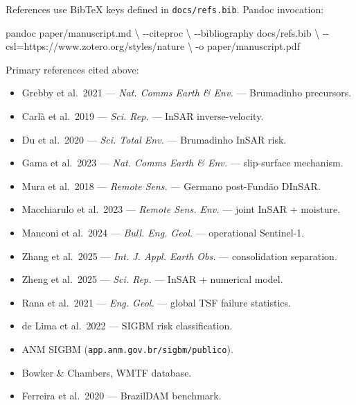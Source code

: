 \documentclass[
  11pt]{article}
\newenvironment{Shaded}{}{}
\newcommand{\AttributeTok}[1]{\textcolor[rgb]{0.49,0.56,0.16}{#1}}
\newcommand{\DataTypeTok}[1]{\textcolor[rgb]{0.56,0.13,0.00}{#1}}
\newcommand{\ExtensionTok}[1]{#1}
\newcommand{\NormalTok}[1]{#1}
\newcommand{\OperatorTok}[1]{\textcolor[rgb]{0.40,0.40,0.40}{#1}}
\providecommand{\tightlist}{%
  \setlength{\itemsep}{0pt}\setlength{\parskip}{0pt}}
\begin{document}
References use BibTeX keys defined in \texttt{docs/refs.bib}. Pandoc
invocation:

\begin{Shaded}
\begin{Highlighting}[]
\ExtensionTok{pandoc}\NormalTok{ paper/manuscript.md }\DataTypeTok{\textbackslash{}}
       \AttributeTok{{-}{-}citeproc} \DataTypeTok{\textbackslash{}}
       \AttributeTok{{-}{-}bibliography}\NormalTok{ docs/refs.bib }\DataTypeTok{\textbackslash{}}
       \AttributeTok{{-}{-}csl}\OperatorTok{=}\NormalTok{https://www.zotero.org/styles/nature }\DataTypeTok{\textbackslash{}}
       \AttributeTok{{-}o}\NormalTok{ paper/manuscript.pdf}
\end{Highlighting}
\end{Shaded}

Primary references cited above:

\begin{itemize}
\tightlist
\item
  Grebby et al.~2021 --- \emph{Nat. Comms Earth \& Env.} --- Brumadinho
  precursors.
\item
  Carlà et al.~2019 --- \emph{Sci. Rep.} --- InSAR inverse-velocity.
\item
  Du et al.~2020 --- \emph{Sci. Total Env.} --- Brumadinho InSAR risk.
\item
  Gama et al.~2023 --- \emph{Nat. Comms Earth \& Env.} --- slip-surface
  mechanism.
\item
  Mura et al.~2018 --- \emph{Remote Sens.} --- Germano post-Fundão
  DInSAR.
\item
  Macchiarulo et al.~2023 --- \emph{Remote Sens. Env.} --- joint InSAR +
  moisture.
\item
  Manconi et al.~2024 --- \emph{Bull. Eng. Geol.} --- operational
  Sentinel-1.
\item
  Zhang et al.~2025 --- \emph{Int. J. Appl. Earth Obs.} ---
  consolidation separation.
\item
  Zheng et al.~2025 --- \emph{Sci. Rep.} --- InSAR + numerical model.
\item
  Rana et al.~2021 --- \emph{Eng. Geol.} --- global TSF failure
  statistics.
\item
  de Lima et al.~2022 --- SIGBM risk classification.
\item
  ANM SIGBM (\texttt{app.anm.gov.br/sigbm/publico}).
\item
  Bowker \& Chambers, WMTF database.
\item
  Ferreira et al.~2020 --- BrazilDAM benchmark.
\end{itemize}
\end{document}
